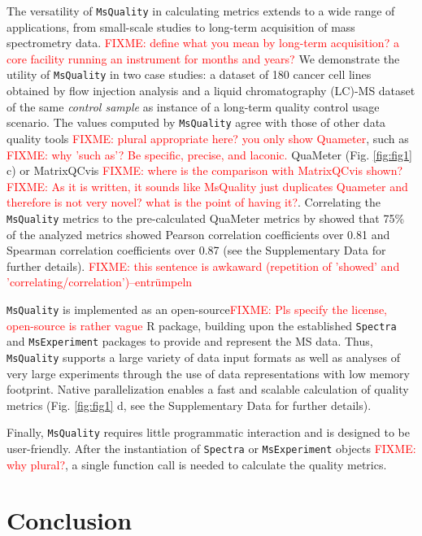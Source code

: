 \documentclass{bioinfo}
\newcommand{\fixme}[1]{\textcolor{red}{FIXME: #1}}
\begin{document}
The versatility of \texttt{MsQuality} in calculating metrics extends to a wide range of
applications, from small-scale studies to long-term acquisition of mass spectrometry
data. \fixme{define what you mean by long-term acquisition? a core facility running an
  instrument for months and years?}  We demonstrate the utility of \texttt{MsQuality} in
two case studies: a dataset of 180 cancer cell lines obtained by flow injection analysis
\citep{Cherkaoui2022} and a liquid chromatography (LC)-MS dataset of the same \emph{control sample}
\citep{Amidan2014} as instance of a long-term quality control usage scenario.  The values computed by \texttt{MsQuality}
agree with those of other data quality tools \fixme{plural appropriate here? you only show Quameter}, such as \fixme{why 'such as'? Be specific, precise, and laconic.} QuaMeter \citep{Ma2012}
(Fig. \ref{fig:fig1} c) or MatrixQCvis \citep{Naake2022}\fixme{ where is the comparison with MatrixQCvis shown?} \fixme{As it is written, it sounds like MsQuality just duplicates Quameter and therefore is not very novel? what is the point of having it?}. Correlating the
\texttt{MsQuality} metrics to the pre-calculated QuaMeter metrics by \citet{Amidan2014} showed
that 75\% of the analyzed metrics showed Pearson correlation coefficients over 0.81 and
Spearman correlation coefficients over 0.87 (see the Supplementary Data for further
details). \fixme{this sentence is awkaward (repetition of 'showed' and 'correlating/correlation')--entr\"umpeln}

\texttt{MsQuality} is implemented as an open-source\fixme{Pls specify the license, open-source is rather vague} R package, building upon the
established \texttt{Spectra} and \texttt{MsExperiment} packages
\citep{Rainer2022} to provide and represent the MS data. Thus, \texttt{MsQuality} supports a large variety of data input formats
as well as analyses of very large experiments through the use of data
representations with low memory footprint. Native parallelization enables a fast
and scalable calculation of quality metrics (Fig. \ref{fig:fig1} d, 
see the Supplementary Data for further details).

Finally, \texttt{MsQuality} requires little programmatic interaction and is designed to be
user-friendly.  After the instantiation of \texttt{Spectra} or \texttt{MsExperiment}
objects \fixme{why plural?}, a single function call is needed to calculate the quality metrics.


\section{Conclusion}
\end{document}
